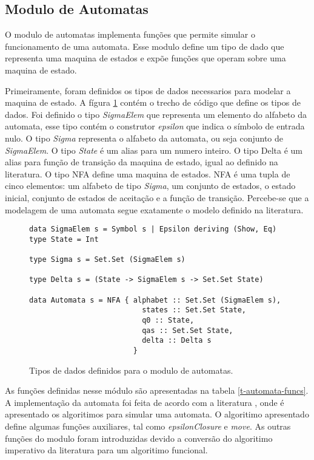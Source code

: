 \subsection{Modulo de Automatas}

O modulo de automatas implementa funções que permite simular o funcionamento de uma automata.
Esse modulo define um tipo de dado que representa uma maquina de estados e expõe funções que operam sobre uma maquina de estado.

Primeiramente, foram definidos os tipos de dados necessarios para modelar a maquina de estado.
A fígura \ref{f-data-automata} contém o trecho de código que define os tipos de dados.
Foi definido o tipo \emph{SigmaElem} que representa um elemento do alfabeto da automata, esse tipo contém o construtor \emph{epsilon} que indica o símbolo de entrada nulo.
O tipo \emph{Sigma} representa o alfabeto da automata, ou seja conjunto de \emph{SigmaElem}.
O tipo \emph{State} é um alias para um numero inteiro.
O tipo Delta é um alias para função de transição da maquina de estado, igual ao definido na literatura.
O tipo NFA define uma maquina de estados.
NFA é uma tupla de cinco elementos: um alfabeto de tipo \emph{Sigma}, um conjunto de estados, o estado inicial, conjunto de estados de aceitação e a função de transição.
Percebe-se que a modelagem de uma automata segue exatamente o modelo definido na literatura.

\begin{figure}
\begin{lstlisting}
data SigmaElem s = Symbol s | Epsilon deriving (Show, Eq)
type State = Int

type Sigma s = Set.Set (SigmaElem s)

type Delta s = (State -> SigmaElem s -> Set.Set State)

data Automata s = NFA { alphabet :: Set.Set (SigmaElem s),
                          states :: Set.Set State,
                          q0 :: State,
                          qas :: Set.Set State,
                          delta :: Delta s
                        }
\end{lstlisting}
\caption{Tipos de dados definidos para o modulo de automatas.}
\label{f-data-automata}
\end{figure}



As funções definidas nesse módulo são apresentadas na tabela \ref{t-automata-funcs}.
A implementação da automata foi feita de acordo com a literatura \cite{dragon-book}, onde é apresentado os algoritimos para simular uma automata.
O algoritimo apresentado define algumas funções auxiliares, tal como \emph{epsilonClosure} e \emph{move}.
As outras funções do modulo foram introduzidas devido a conversão do algoritimo imperativo da literatura para um algoritimo funcional.

